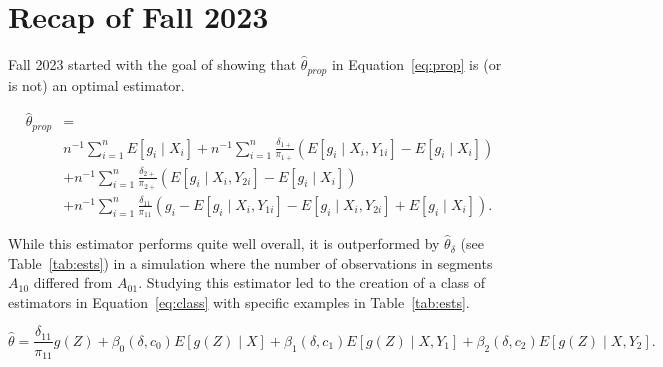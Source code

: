 \documentclass[12pt]{article}
\begin{document}
\rhead{\today}

\section*{Recap of Fall 2023}

Fall 2023 started with the goal of showing that $\hat \theta_{prop}$ in
Equation~\ref{eq:prop} is (or is not) an optimal estimator.

\begin{align}
  \hat \theta_{prop} &= \label{eq:prop}\\ \nonumber
  &n^{-1} \sum_{i = 1}^n E[g_i \mid X_i] + n^{-1} \sum_{i = 1}^n
  \frac{\delta_{1+}}{\pi_{1+}} (E[g_i \mid X_i, Y_{1i}] - E[g_i \mid X_i]) \\
  \nonumber
  &+ n^{-1} \sum_{i = 1}^n \frac{\delta_{2+}}{\pi_{2+}} (E[g_i \mid X_i,
  Y_{2i}] - E[g_i \mid X_i]) \\ \nonumber
  &+ n^{-1} \sum_{i = 1}^n \frac{\delta_{11}}{\pi_{11}} (g_i - E[g_i \mid X_i,
  Y_{1i}] - E[g_i \mid X_i, Y_{2i}] + E[g_i \mid X_i]). \nonumber
\end{align}

While this estimator performs quite well overall, it is outperformed by 
$\hat \theta_\delta$ (see Table~\ref{tab:ests}) in a simulation where the 
number of observations in segments $A_{10}$ differed from $A_{01}$. Studying 
this estimator led to the creation of a class of estimators in
Equation~\ref{eq:class} with specific examples in Table~\ref{tab:ests}.

\begin{equation}\label{eq:class}
\hat \theta = \frac{\delta_{11}}{\pi_{11}}g(Z) + \beta_0(\delta, c_0)E[g(Z)
\mid X] + \beta_1(\delta, c_1)E[g(Z) \mid X, Y_1] + \beta_2(\delta, c_2) E[g(Z)
\mid X, Y_2].
\end{equation}
\end{document}
